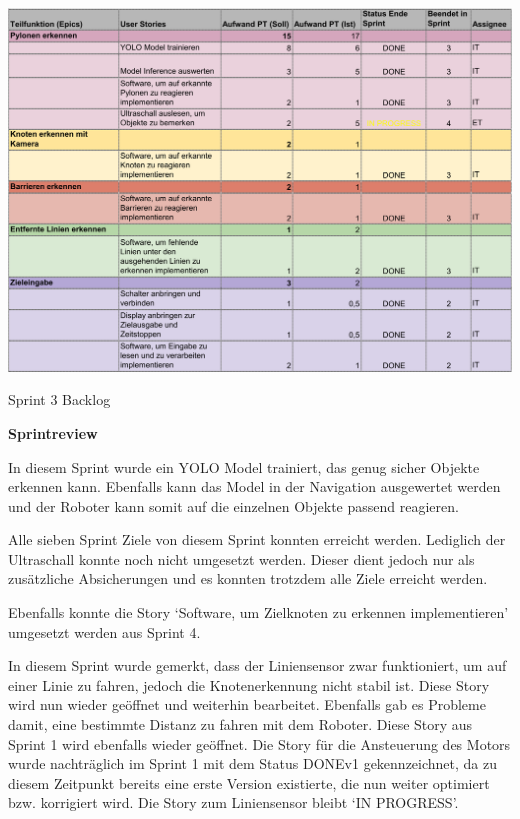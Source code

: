 \begin{table}[H]
\centering
\includegraphics[width=\textwidth]{assets/projektmanagement/sprint3-crop.pdf}
\caption{Sprint 3 Backlog}
\label{table:sprint3-backlog}
\end{table}


\textbf{Sprintreview}

In diesem Sprint wurde ein YOLO Model trainiert, das genug sicher Objekte erkennen kann. Ebenfalls kann das Model in der Navigation ausgewertet werden und der Roboter kann somit auf die einzelnen Objekte passend reagieren. 

Alle sieben Sprint Ziele von diesem Sprint konnten erreicht werden. Lediglich der Ultraschall konnte noch nicht umgesetzt werden. Dieser dient jedoch nur als zusätzliche Absicherungen und es konnten trotzdem alle Ziele erreicht werden.

Ebenfalls konnte die Story `Software, um Zielknoten zu erkennen implementieren' umgesetzt werden aus Sprint 4.

In diesem Sprint wurde gemerkt, dass der Liniensensor zwar funktioniert, um auf einer Linie zu fahren, jedoch die Knotenerkennung nicht stabil ist. Diese Story wird nun wieder geöffnet und weiterhin bearbeitet. Ebenfalls gab es Probleme damit, eine bestimmte Distanz zu fahren mit dem Roboter. Diese Story aus Sprint 1 wird ebenfalls wieder geöffnet. Die Story für die Ansteuerung des Motors wurde nachträglich im Sprint 1  mit dem Status DONEv1 gekennzeichnet, da zu diesem Zeitpunkt bereits eine erste Version existierte, die nun weiter optimiert bzw. korrigiert wird. Die Story zum Liniensensor bleibt `IN PROGRESS'.

